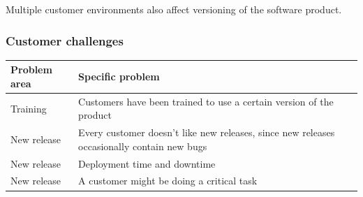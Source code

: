 \documentclass[english]{tktltiki2}
\theoremstyle{definition}
\theoremstyle{remark}
\begin{document}
Multiple customer environments also affect versioning of the software product. 


\subsubsection{Customer challenges}

\begin{center}
    \begin{tabular}{ | l | p{5cm} |}
    \hline
    Problem area & Specific problem \\ \hline
    Training & Customers have been trained to use a certain version of the product \\ \hline
	New release & Every customer doesn't like new releases, since new releases occasionally contain new bugs \\ \hline
	New release & Deployment time and downtime \\ \hline
	New release & A customer might be doing a critical task \\
    \hline
    \end{tabular}
\end{center}
\end{document}
